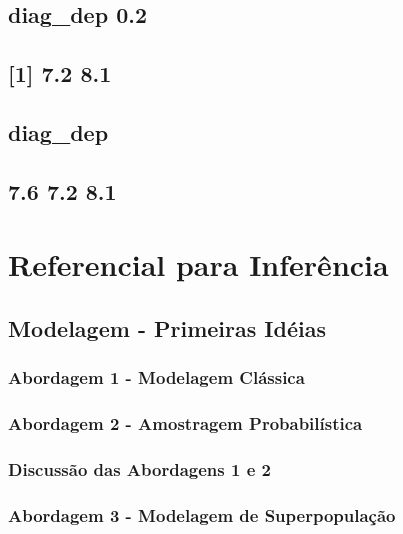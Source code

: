 \documentclass[]{book}
\theoremstyle{definition}
\theoremstyle{definition}
\theoremstyle{definition}
\theoremstyle{remark}
\begin{document}
\section{diag\_dep 0.2}\label{diag_dep-0.2}

\section{{[}1{]} 7.2 8.1}\label{section-7}

\section{diag\_dep}\label{diag_dep-2}

\section{7.6 7.2 8.1}\label{section-8}

\chapter{Referencial para Inferência}\label{refinf}

\section{Modelagem - Primeiras Idéias}\label{classic}

\subsection{Abordagem 1 - Modelagem
Clássica}\label{abordagem-1---modelagem-classica}

\subsection{Abordagem 2 - Amostragem
Probabilística}\label{abordagem-2---amostragem-probabilistica}

\subsection{Discussão das Abordagens 1 e
2}\label{discussao-das-abordagens-1-e-2}

\subsection{Abordagem 3 - Modelagem de
Superpopulação}\label{modelsuperpop}
\end{document}
